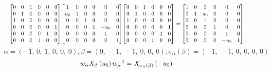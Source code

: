 \documentclass[11pt]{article}
\theoremstyle{definition}
\begin{document}
\[
\scaletoalign{\textwidth}{{\left[\begin{matrix}0 & 0 & 1 & 0 & 0 & 0\\0 & 1 & 0 & 0 & 0 & 0\\1 & 0 & 0 & 0 & 0 & 0\\0 & 0 & 0 & 0 & 0 & 1\\0 & 0 & 0 & 0 & 1 & 0\\0 & 0 & 0 & 1 & 0 & 0\end{matrix}\right]} {\left[\begin{matrix}1 & 0 & 0 & 0 & 0 & 0\\u_{0} & 1 & 0 & 0 & 0 & 0\\0 & 0 & 1 & 0 & 0 & 0\\0 & 0 & 0 & 1 & - u_{0} & 0\\0 & 0 & 0 & 0 & 1 & 0\\0 & 0 & 0 & 0 & 0 & 1\end{matrix}\right]} {\left[\begin{matrix}0 & 0 & 1 & 0 & 0 & 0\\0 & 1 & 0 & 0 & 0 & 0\\1 & 0 & 0 & 0 & 0 & 0\\0 & 0 & 0 & 0 & 0 & 1\\0 & 0 & 0 & 0 & 1 & 0\\0 & 0 & 0 & 1 & 0 & 0\end{matrix}\right]} = {\left[\begin{matrix}1 & 0 & 0 & 0 & 0 & 0\\0 & 1 & u_{0} & 0 & 0 & 0\\0 & 0 & 1 & 0 & 0 & 0\\0 & 0 & 0 & 1 & 0 & 0\\0 & 0 & 0 & 0 & 1 & 0\\0 & 0 & 0 & 0 & - u_{0} & 1\end{matrix}\right]}}
\]
\[
\alpha = \left( -1, \  0, \  1, \  0, \  0, \  0\right), \beta = \left( 0, \  -1, \  -1, \  0, \  0, \  0\right), \sigma_{\alpha}(\beta) = \left( -1, \  -1, \  0, \  0, \  0, \  0\right)
\]
\[
\scaletoalign{\textwidth}{w_{\alpha} X_{\beta}\left(u_{0}\right) w_{\alpha}^{-1} = X_{\sigma_{\alpha}\left(\beta\right)}\left(- u_{0}\right)}
\]
\end{document}
